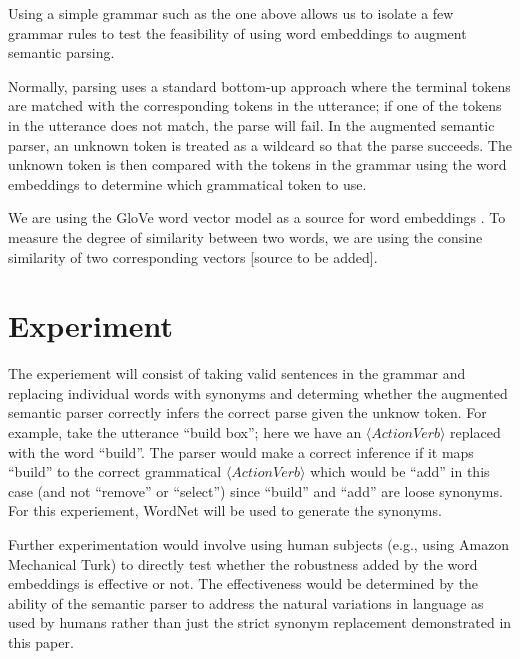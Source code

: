\documentclass[a4paper]{article}
\begin{document}
Using a simple grammar such as the one above allows us to isolate a few grammar
rules to test the feasibility of using word embeddings to augment semantic
parsing.

Normally, parsing uses a standard bottom-up approach where the terminal tokens
are matched with the corresponding tokens in the utterance; if one of the
tokens in the utterance does not match, the parse will fail.
In the augmented semantic parser, an unknown token is treated as a wildcard
so that the parse succeeds. The unknown token is then compared with the
tokens in the grammar using the word embeddings to determine which grammatical
token to use.

We are using the GloVe word vector model as a source for word embeddings
\cite{pennington2014glove}.
To measure the degree of similarity between two words, we are using the consine
similarity of two corresponding vectors
[source to be added].





\section{Experiment}

The experiement will consist of taking valid sentences in the grammar and
replacing individual words with synonyms and determing whether the augmented
semantic parser correctly infers the correct parse given the unknow token.
For example, take the utterance ``build box''; here we have an $\langle ActionVerb\rangle$
replaced with the word ``build''.
The parser would make a correct inference if it maps ``build'' to the correct
grammatical $\langle ActionVerb\rangle$ which would be ``add'' in this case (and not
``remove'' or ``select'') since ``build'' and ``add'' are loose synonyms.
For this experiement, WordNet will be used to generate the synonyms.

Further experimentation would involve using human subjects (e.g., using
Amazon Mechanical Turk) to directly test whether the robustness added by the
word embeddings is effective or not.
The effectiveness would be determined by the ability of the semantic parser
to address the natural variations in language as used by humans rather than
just the strict synonym replacement demonstrated in this paper.
\end{document}
